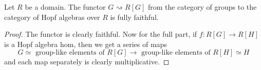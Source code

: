 \begin{proposition}
  \label{0-full-faithful-grp-alg}
  \leanok

  Let $R$ be a domain.
  The functor $G \rightsquigarrow R[G]$ from the category of groups to the category of Hopf algebras over $R$ is fully faithful.
\end{proposition}
\begin{proof}
  \leanok

  The functor is clearly faithful.
  Now for the full part, if $f : R[G] \to R[H]$ is a Hopf algebra hom, then we get a series of maps
  \[
    G \simeq \text{ group-like elements of } R[G] \to \text{ group-like elements of } R[H] \simeq H
  \]
  and each map separately is clearly multiplicative.
\end{proof}
